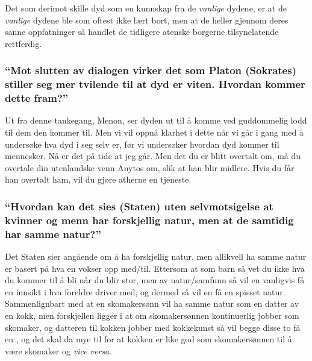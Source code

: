 \documentclass[a4paper]{IEEEtran}
\begin{document}
        Det som derimot skille dyd som en kunnskap fra de \textit{vanlige} dydene,
        er at de \textit{vanlige} dydene ble som oftest ikke lært bort, men
        at de heller gjennom deres sanne oppfatninger så handlet de tidligere
        atenske borgerne tilsynelatende rettferdig. \cite{wiki_Menon} \medskip

        \subsubsection{``Mot slutten av dialogen virker det som Platon (Sokrates) 
        stiller seg mer tvilende til at dyd er viten. Hvordan kommer dette fram?''}
        
        \begin{displayquote}
            Ut fra denne tankegang, Menon, ser dyden ut til å komme ved guddommelig 
            lodd til dem den kommer til. Men vi vil oppnå klarhet i dette når vi
            går i gang med å undersøke hva dyd i seg selv er, før vi undersøker
            hvordan dyd kommer til mennesker. Nå er det på tide at jeg går. 
            Men det du er blitt overtalt om, må du overtale din utenlandske venn
            Anytos om, slik at han blir midlere. Hvis du får han overtalt ham, 
            vil du gjøre atherne en tjeneste.
        \end{displayquote} \medskip

        \subsubsection{``Hvordan kan det sies (Staten) uten selvmotsigelse at kvinner 
        og menn har forskjellig natur, men at de samtidig har samme natur?''}
        Det Staten sier angående om å ha forskjellig natur, men allikvell ha samme natur 
        er basert på hva en vokser opp med/til. Ettersom at som barn så vet du ikke hva
        du kommer til å bli når du blir stor, men av natur/samfunn så vil en vanligvis
        få en innsikt i hva foreldre driver med, og dermed så vil en få en spisset natur.
        Sammenlignbart med at en skomakersønn vil ha samme natur som en datter av en kokk,
        men forskjellen ligger i at om skomakersønnen kontinuerlig jobber som skomaker,
        og datteren til kokken jobber med kokkekunst så vil begge disse to få en 
        , og det skal da mye til for at kokken er like god 
        som skomakersønnen til å være skomaker og \textit{vice versa}. \medskip
\end{document}
